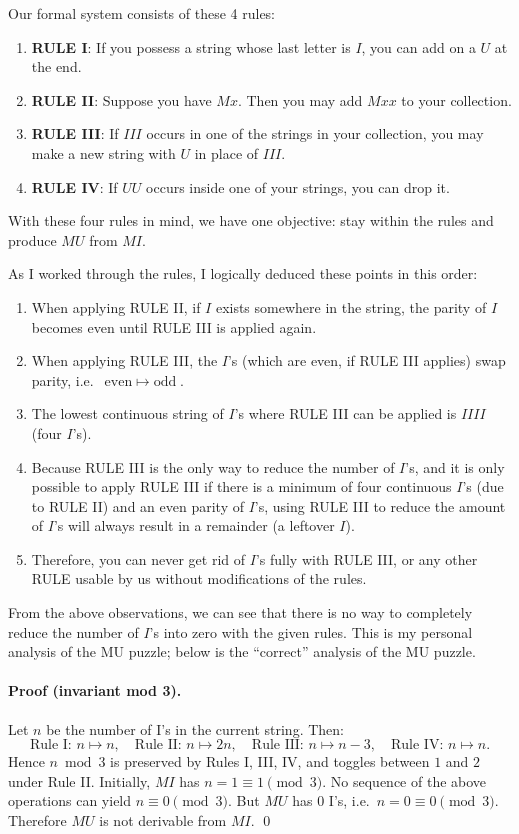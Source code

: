 \documentclass{article}
\theoremstyle{theorem}
\theoremstyle{definition}
\theoremstyle{remark}
\begin{document}
Our formal system consists of these 4 rules:
\begin{enumerate}
    \item \textbf{RULE I}: If you possess a string whose last letter is $I$, you can add on a $U$ at the end. 
    \item \textbf{RULE II}: Suppose you have $Mx$. Then you may add $Mxx$ to your collection. 
    \item \textbf{RULE III}: If $III$ occurs in one of the strings in your collection, you may make a new string with $U$ in place of $III$.
    \item \textbf{RULE IV}: If $UU$ occurs inside one of your strings, you can drop it. 
\end{enumerate}

With these four rules in mind, we have one objective: stay within the rules and produce $MU$ from $MI$.

As I worked through the rules, I logically deduced these points in this order:
\begin{enumerate}
    \item When applying RULE II, if $I$ exists somewhere in the string, the parity of $I$ becomes even until RULE III is applied again.
    \item When applying RULE III, the $I$'s (which are even, if RULE III applies) swap parity, i.e.\ $\text{even} \;\mapsto\; \text{odd}$.
    \item The lowest continuous string of $I$'s where RULE III can be applied is $IIII$ (four $I$'s).
    \item Because RULE III is the only way to reduce the number of $I$'s, and it is only possible to apply RULE III if there is a minimum of four continuous $I$'s (due to RULE II) and an even parity of $I$'s, using RULE III to reduce the amount of $I$'s will always result in a remainder (a leftover $I$).
    \item Therefore, you can never get rid of $I$'s fully with RULE III, or any other RULE usable by us without modifications of the rules.
\end{enumerate}

From the above observations, we can see that there is no way to completely reduce the number of $I$'s into zero with the given rules. This is my personal analysis of the MU puzzle; below is the ``correct'' analysis of the MU puzzle.


\paragraph{Proof (invariant mod 3).}
Let $n$ be the number of I’s in the current string. Then:
\[
\text{Rule I: } n\mapsto n,\quad
\text{Rule II: } n\mapsto 2n,\quad
\text{Rule III: } n\mapsto n-3,\quad
\text{Rule IV: } n\mapsto n.
\]
Hence $n\bmod 3$ is preserved by Rules I, III, IV, and toggles between $1$ and $2$ under Rule II.
Initially, $MI$ has $n=1\equiv 1\pmod 3$. No sequence of the above operations can yield $n\equiv 0\pmod 3$.
But $MU$ has $0$ I’s, i.e.\ $n=0\equiv 0\pmod 3$. Therefore $MU$ is not derivable from $MI$.
\qed
\end{document}
